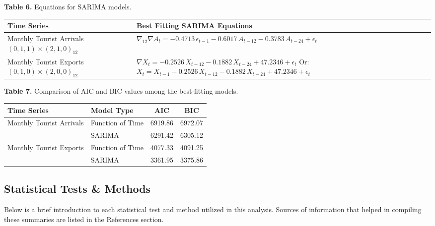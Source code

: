 \documentclass[11pt]{article}
\begin{document}
\begin{center}
\textbf{Table 6.} Equations for SARIMA models.
\smallskip

\begin{tabular}{@{}p{} p{}@{}}
\toprule
\textbf{Time Series} & \textbf{Best Fitting SARIMA Equations} \\
\midrule
Monthly Tourist Arrivals \newline $(0,1,1)\times(2,1,0)_{12}$ & $\nabla_{12}\nabla A_{t} = -0.4713\,\epsilon_{t-1} - 0.6017\,A_{t-12} - 0.3783\,A_{t-24} + \epsilon_{t}$ \\[0.8em]
Monthly Tourist Exports \newline $(0,1,0)\times(2,0,0)_{12}$ & $\nabla X_{t} = -0.2526\,X_{t-12} - 0.1882\,X_{t-24} + 47.2346 + \epsilon_{t}$ \newline Or: \newline $X_{t} = X_{t-1} - 0.2526\,X_{t-12} - 0.1882\,X_{t-24} + 47.2346 + \epsilon_{t}$ \\
\bottomrule
\end{tabular}
\end{center}
\bigskip

\begin{center}
\textbf{Table 7.} Comparison of AIC and BIC values among the best-fitting models.
\smallskip

\begin{tabular}{@{}l l c c@{}}
\toprule
\textbf{Time Series} & \textbf{Model Type} & \textbf{AIC} & \textbf{BIC} \\
\midrule
\multirow{2}{*}{Monthly Tourist Arrivals} & Function of Time & 6919.86 & 6972.07 \\
 & SARIMA & 6291.42 & 6305.12 \\
\multirow{2}{*}{Monthly Tourist Exports} & Function of Time & 4077.33 & 4091.25 \\
 & SARIMA & 3361.95 & 3375.86 \\
\bottomrule
\end{tabular}
\end{center}
\bigskip

\subsection{Statistical Tests \& Methods}

Below is a brief introduction to each statistical test and method utilized in this analysis. Sources of information that helped in compiling these summaries are listed in the References section.
\end{document}
